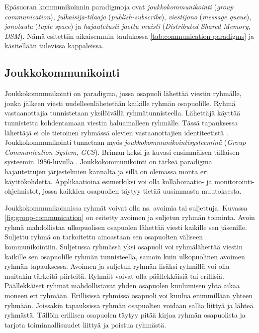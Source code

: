 Epäsuoran kommunikoinnin paradigmoja ovat \emph{joukkokommunikointi} (\emph{group communication}), \emph{julkaisija-tilaaja} (\emph{publish-subscribe}), \emph{viestijono} (\emph{message queue}), \emph{jonotaulu} (\emph{tuple space}) ja \emph{hajautetusti jaettu muisti} (\emph{Distributed Shared Memory}, \emph{DSM}). Nämä esitettiin aikaisemmin taulukossa \ref{tab:communication-paradigms} ja käsitellään tulevissa kappaleissa.


\subsection{Joukkokommunikointi}
Joukkokommunikointi on paradigma, jossa osapuoli lähettää viestin ryhmälle, jonka jälkeen viesti uudelleenlähetetään kaikille ryhmän osapuolille. Ryhmä vastaanottajia tunnistetaan yksilöivällä ryhmätunnisteella. Lähettäjä käyttää tunnistetta kohdentamaan viestin haluamalleen ryhmälle. Tässä tapauksessa lähettäjä ei ole tietoinen ryhmässä olevien vastaanottajien identiteetistä \cite[s.~232--233]{distributed-systems-concepts-and-design}. Joukkokommunikointi tunnetaan myös \emph{joukkokommunikointisysteeminä} (\emph{Group Communication System}, \emph{GCS}). Briman keksi ja kuvasi ensimmäisen tällaisen systeemin 1986-luvulla \cite{isis-fault-tolerant-distributed-computing}. Joukkokommunikointi on tärkeä paradigma hajautettujen järjestelmien kannalta ja sillä on olemassa monta eri käyttökohdetta. Applikaatioina esimerkiksi voi olla kollaboraatio- ja monitorointi-ohjelmistot, jossa kaikkien osapuolien täytyy tietää uusimmasta muutoksesta.

Joukkokommunikoinnissa ryhmät voivat olla ns. avoimia tai suljettuja. Kuvassa \ref{fig:group-communication} on esitetty avoimen ja suljetun ryhmän toiminta. Avoin ryhmä mahdollistaa ulkopuolisen osapuolen lähettää viesti kaikille sen jäsenille. Suljettu ryhmä on tarkoitettu ainoastaan sen osapuolten väliseen kommunikointiin. Suljetussa ryhmässä yksi osapuoli voi ryhmälähettää viestin kaikille sen osapuolille ryhmän tunnisteella, samoin kuin ulkopuolinen avoimen ryhmän tapauksessa. Avoimen ja suljetun ryhmän lisäksi ryhmillä voi olla muitakin tärkeitä piirteitä. Ryhmät voivat olla päällekkäisiä tai erillisiä. Päällekkäiset ryhmät mahdollistavat yhden osapuolen kuulumisen yhtä aikaa moneen eri ryhmään. Erillisissä ryhmissä osapuoli voi kuulua enimmillään yhteen ryhmään. Joissakin tapauksissa ryhmän osapuolten voidaan sallia liittyä ja lähteä ryhmästä. Tällöin erillisen osapuolen täytyy pitää kirjaa ryhmän osapuolista ja tarjota toiminnallisuudet liittyä ja poistua ryhmästä. \mbox{\cite[s.~233--235]{distributed-systems-concepts-and-design}} \mbox{\cite[s.~48]{process-group-approach-briman}}


